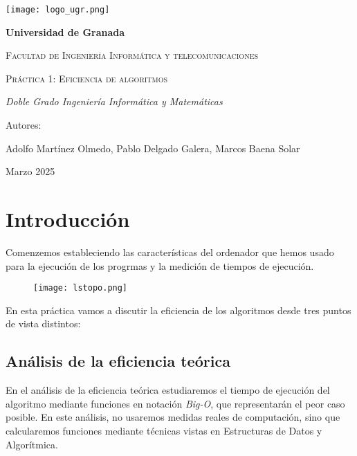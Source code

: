 \documentclass[a4paper,12pt]{article} %
\begin{document}
\begin{titlepage}
	\centering

	\texttt{[image: logo\_ugr.png]} %
	\vspace{1cm} %

	{\bfseries\LARGE Universidad de Granada \par}
	\vspace{1cm}
	{\scshape\Large Facultad de Ingeniería Informática y telecomunicaciones \par}
	\vspace{3cm}
	{\scshape\Huge Práctica 1: Eficiencia de algoritmos \par}
	\vspace{3cm}
	{\itshape\Large Doble Grado Ingeniería Informática y Matemáticas \par}
	\vfill
	{\Large Autores: \par}
	{\Large Adolfo Martínez Olmedo, Pablo Delgado Galera, Marcos Baena Solar \par}
	\vfill
	{\Large Marzo 2025 \par}
\end{titlepage}

\tableofcontents
\newpage


\section{Introducción}
Comenzemos estableciendo las características del ordenador que hemos usado para la 
ejecución de los progrmas y la medición de tiempos de ejecución.

\begin{figure}[htbp]
    \centering
    \texttt{[image: lstopo.png]} 
    \label{fig:lstopo}
\end{figure}


En esta práctica vamos a discutir la eficiencia de los algoritmos
desde tres puntos de vista distintos:


\subsection{Análisis de la eficiencia teórica}
En el análisis de la eficiencia teórica estudiaremos el tiempo de ejecución del algoritmo
mediante funciones en notación \textit{Big-O}, que representarán el peor caso posible.
En este análisis, no usaremos medidas reales de computación, sino que calcularemos funciones
mediante técnicas vistas en Estructuras de Datos y Algorítmica.
\end{document}
